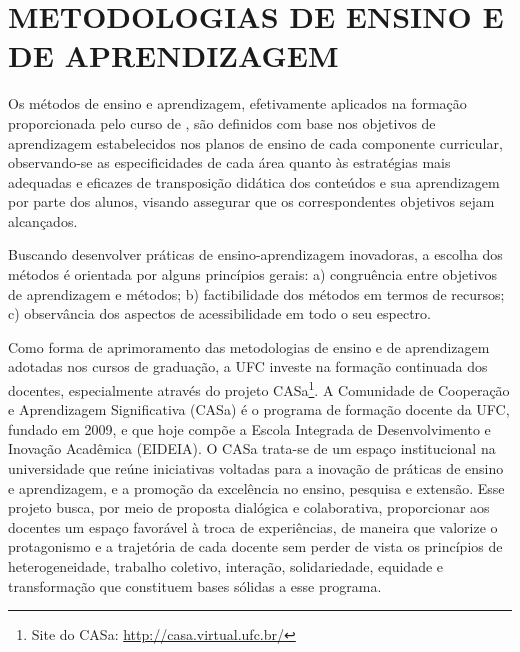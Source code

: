 \chapter{METODOLOGIAS DE ENSINO E DE APRENDIZAGEM}
\label{cap:metodologias-de-ensino}

Os métodos de ensino e aprendizagem, efetivamente aplicados na formação proporcionada pelo curso de \nomedocurso, são definidos com base nos objetivos de aprendizagem estabelecidos nos planos de ensino de cada componente curricular, observando-se as especificidades de cada área quanto às estratégias mais adequadas e eficazes de transposição didática dos conteúdos e sua aprendizagem por parte dos alunos, visando assegurar que os correspondentes objetivos sejam alcançados.

Buscando desenvolver práticas de ensino-aprendizagem inovadoras, a escolha dos métodos é orientada por alguns princípios gerais: a) congruência entre objetivos de aprendizagem e métodos; b) factibilidade dos métodos em termos de recursos; c) observância dos aspectos de acessibilidade em todo o seu espectro.

Como forma de aprimoramento das metodologias de ensino e de aprendizagem adotadas nos cursos de graduação, a UFC investe na formação continuada dos docentes, especialmente através do projeto CASa\footnote{Site do CASa: \url{http://casa.virtual.ufc.br/}}. A Comunidade de Cooperação e Aprendizagem Significativa (CASa) é o programa de formação docente da UFC, fundado em 2009, e que hoje compõe a Escola Integrada de Desenvolvimento e Inovação Acadêmica (EIDEIA). O CASa trata-se de um espaço institucional na universidade que reúne iniciativas voltadas para a inovação de práticas de ensino e aprendizagem, e a promoção da excelência no ensino, pesquisa e extensão. Esse projeto busca, por meio de proposta dialógica e colaborativa, proporcionar aos docentes um espaço favorável à troca de experiências, de maneira que valorize o protagonismo e a trajetória de cada docente sem perder de vista os princípios de heterogeneidade, trabalho coletivo, interação, solidariedade, equidade e transformação que constituem bases sólidas a esse programa.

